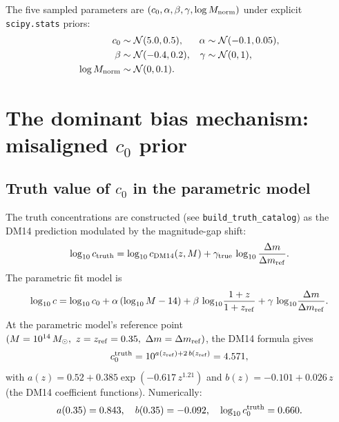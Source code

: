 \documentclass[11pt,a4paper]{article}
\newcommand{\dm}{\Delta m}
\newcommand{\dmref}{\dm_{\rm ref}}
\newcommand{\zref}{z_{\rm ref}}
\begin{document}
The five sampled parameters are $(c_0, \alpha, \beta, \gamma, \log
M_{\rm norm})$ under explicit \texttt{scipy.stats} priors:
\begin{equation}
\begin{aligned}
  c_0 &\sim \mathcal{N}( 5.0, 0.5), & \alpha &\sim \mathcal{N}(-0.1, 0.05),\\
  \beta &\sim \mathcal{N}(-0.4, 0.2), & \gamma &\sim \mathcal{N}(0, 1),\\
  \log M_{\rm norm} &\sim \mathcal{N}(0, 0.1). &&
\end{aligned}
\label{eq:priors}
\end{equation}

\section{The dominant bias mechanism: misaligned $c_0$ prior}

\subsection{Truth value of $c_0$ in the parametric model}

The truth concentrations are constructed (see \texttt{build\_truth\_catalog})
as the DM14 \citep{DuttonMaccio2014} prediction modulated by the magnitude-gap
shift:
\begin{equation}
  \log_{10} c_{\rm truth} = \log_{10} c_{\rm DM14}(z, M) + \gamma_{\rm true}\,\log_{10}\frac{\dm}{\dmref}.
\end{equation}
The parametric fit model is
\begin{equation}
  \log_{10} c = \log_{10} c_0 + \alpha\,(\log_{10}M - 14)
              + \beta\,\log_{10}\!\frac{1+z}{1+\zref}
              + \gamma\,\log_{10}\!\frac{\dm}{\dmref}.
  \label{eq:param}
\end{equation}
At the parametric model's reference point $(M=10^{14}\,M_\odot,\ z=\zref=0.35,\ \dm=\dmref)$,
the DM14 formula gives
\begin{equation}
  c_0^{\rm truth}
    = 10^{a(\zref) + 2\,b(\zref)} = 4.571,
\end{equation}
with $a(z) = 0.52 + 0.385\exp(-0.617\,z^{1.21})$ and
$b(z) = -0.101 + 0.026\,z$ (the DM14 coefficient functions).  Numerically:
\begin{equation}
  a(0.35) = 0.843,\quad b(0.35) = -0.092,\quad \log_{10} c_0^{\rm truth} = 0.660.
\end{equation}
\end{document}
